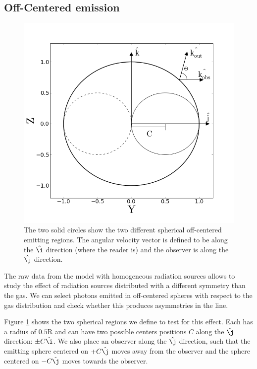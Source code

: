 \documentclass{emulateapj}
\begin{document}
\subsection{Off-Centered emission}
\label{sec:off-center}
\begin{figure}
  \includegraphics[scale=0.35]{OF_spheres.png}
  \caption{The two solid circles show the two different spherical
    off-centered emitting  regions. The angular velocity vector is
    defined to be along the $\hat{\i}$ direction (where the reader is) 
    and the observer is along the $\hat{\j}$ direction. 
    \label{fig:OCspheres}} 
\end{figure}

The raw data from the model with homogeneous radiation sources allows
to study the effect of radiation sources distributed with a different
symmetry than the gas. We can select photons emitted in off-centered spheres 
with respect to the gas distribution and check whether this produces
asymmetries in the line.


Figure \ref{fig:OCspheres} shows the two spherical regions we
define to test for this effect. Each has a radius of $0.5$R and can
have two possible centers positions $C$ along the $\hat{\j}$ direction:
$\pm C\hat{\i}$. We also place an observer along the $\hat{\j}$
direction, such that the emitting sphere centered on $+C\hat{\j}$ moves
away from the observer and the sphere centered on $-C\hat{\j}$ moves
towards the observer. 
\end{document}
